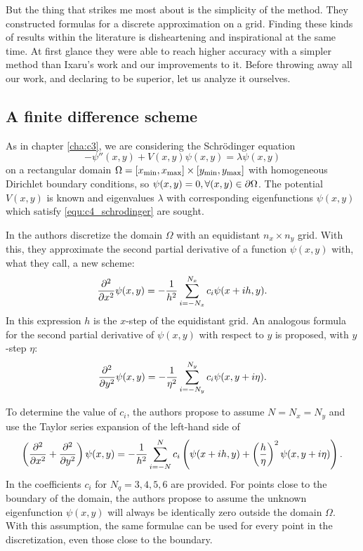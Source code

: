 But the thing that strikes me most about \cite{wang_new_2009} is the simplicity of the method. They constructed formulas for a discrete approximation on a grid. Finding these kinds of results within the literature is disheartening and inspirational at the same time. At first glance they were able to reach higher accuracy with a simpler method than Ixaru's work \cite{ixaru_new_2010} and our improvements \cite{baeyens_improvements_2022} to it. Before throwing away all our work, and declaring \cite{wang_new_2009} to be superior, let us analyze it ourselves.

\subsection{A finite difference scheme}\label{sec:c4_fd_scheme}

As in chapter \ref{cha:c3}, we are considering the Schrödinger equation
\begin{equation}\label{equ:c4_schrodinger}
    -\psi''(x, y) + V(x, y) \psi(x, y) = \lambda \psi(x, y)
\end{equation}
on a rectangular domain $\Omega = [{x_{\text{min}}}, {x_{\text{max}}}] \times [{y_{\text{min}}}, {y_{\text{max}}}]$ with homogeneous Dirichlet boundary conditions, so $\psi(x, y) = 0, \forall (x, y) \in \partial\Omega$. The potential $V(x, y)$ is known and eigenvalues $\lambda$ with corresponding eigenfunctions $\psi(x, y)$ which satisfy \eqref{equ:c4_schrodinger} are sought.

In \cite{wang_new_2009} the authors discretize the domain $\Omega$ with an equidistant $n_x \times n_y$ grid. With this, they approximate the second partial derivative of a function $\psi(x, y)$ with, what they call, a new scheme:
$$
    {\pdv[2]{}{x}}\psi(x, y) = -\frac{1}{h^2}\sum_{i=-N_x}^{N_x} c_i \psi(x + ih, y)\text{.}
$$
In this expression $h$ is the $x$-step of the equidistant grid. An analogous formula for the second partial derivative of $\psi(x, y)$ with respect to $y$ is proposed, with $y$-step $\eta$:
$$
    {\pdv[2]{}{y}}\psi(x, y) = -\frac{1}{\eta^2}\sum_{i=-N_y}^{N_y} c_i \psi(x, y + i\eta)\text{.}
$$

To determine the value of $c_i$, the authors propose to assume $N = N_x = N_y$ and use the Taylor series expansion of the left-hand side of
$$
    \left({\pdv[2]{}{x}} + {\pdv[2]{}{y}}\right)\psi(x, y) = -\frac{1}{h^2} \sum_{i=-N}^{N} c_i \left(\psi(x+ih, y) + \left(\frac{h}{\eta}\right)^2\psi(x, y+i\eta)\right)\text{.}
$$
In \cite{wang_new_2009} the coefficients $c_i$ for $N_q = 3, 4, 5, 6$ are provided. For points close to the boundary of the domain, the authors propose to assume the unknown eigenfunction $\psi(x, y)$ will always be identically zero outside the domain $\Omega$. With this assumption, the same formulae can be used for every point in the discretization, even those close to the boundary.

